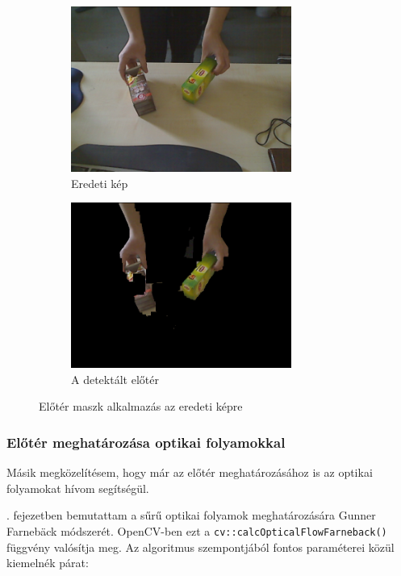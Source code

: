 \begin{figure}[tbh]
\centering
\begin{subfigure}[b]{.49\linewidth}
	\centering
	\includegraphics[width=205pt]{figures/image343.png}
	\caption{Eredeti kép}
  \end{subfigure}
\begin{subfigure}[b]{.49\linewidth}
	\centering
	\includegraphics[width=205pt]{figures/mask343_applied.png}
	\caption{A detektált előtér}
  \end{subfigure}
\caption{Előtér maszk alkalmazás az eredeti képre \label{fig:mask_applied}}
\end{figure}

    \subsubsection{Előtér meghatározása optikai folyamokkal \label{sec:of-mask}}
    
Másik megközelítésem, hogy már az előtér meghatározásához is az optikai folyamokat hívom segítségül. 

. fejezetben bemutattam a sűrű optikai folyamok meghatározására Gunner Farnebäck módszerét. OpenCV-ben ezt a \texttt{cv::calcOpticalFlowFarneback()} \cite{opencv-mog} függvény valósítja meg. Az algoritmus szempontjából fontos paraméterei közül kiemelnék párat:

